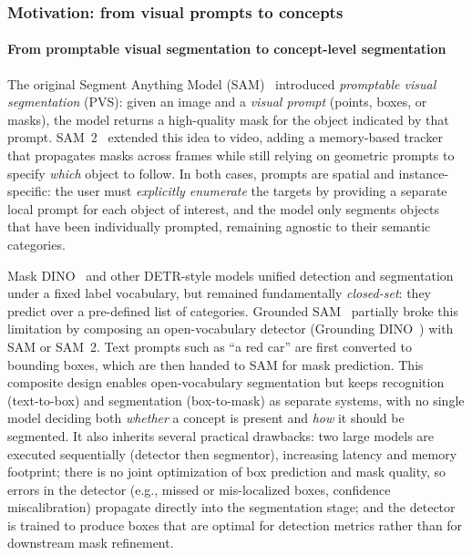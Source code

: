 \begin{enrichment}
\begin{enrichment}
		\subsubsection{Motivation: from visual prompts to concepts}
		\label{subsubsec:chapter15_sam3_motivation}
		
		\paragraph{From promptable visual segmentation to concept-level segmentation}
		
		The original Segment Anything Model (SAM)~\cite{kirillov2023_sam} introduced \emph{promptable visual segmentation} (PVS): given an image and a \emph{visual prompt} (points, boxes, or masks), the model returns a high-quality mask for the object indicated by that prompt. SAM~2~\cite{ravi2024_sam2} extended this idea to video, adding a memory-based tracker that propagates masks across frames while still relying on geometric prompts to specify \emph{which} object to follow. In both cases, prompts are spatial and instance-specific: the user must \emph{explicitly enumerate} the targets by providing a separate local prompt for each object of interest, and the model only segments objects that have been individually prompted, remaining agnostic to their semantic categories.
		
		Mask DINO~\cite{li2022_maskdino} and other DETR-style models unified detection and segmentation under a fixed label vocabulary, but remained fundamentally \emph{closed-set}: they predict over a pre-defined list of categories. Grounded SAM~\cite{ren2024_groundedsam} partially broke this limitation by composing an open-vocabulary detector (Grounding DINO~\cite{liu2023_groundingdino}) with SAM or SAM~2. Text prompts such as ``a red car'' are first converted to bounding boxes, which are then handed to SAM for mask prediction. This composite design enables open-vocabulary segmentation but keeps recognition (text-to-box) and segmentation (box-to-mask) as separate systems, with no single model deciding both \emph{whether} a concept is present and \emph{how} it should be segmented. It also inherits several practical drawbacks: two large models are executed sequentially (detector then segmentor), increasing latency and memory footprint; there is no joint optimization of box prediction and mask quality, so errors in the detector (e.g., missed or mis-localized boxes, confidence miscalibration) propagate directly into the segmentation stage; and the detector is trained to produce boxes that are optimal for detection metrics rather than for downstream mask refinement. 
		

\end{enrichment}
\end{enrichment}
